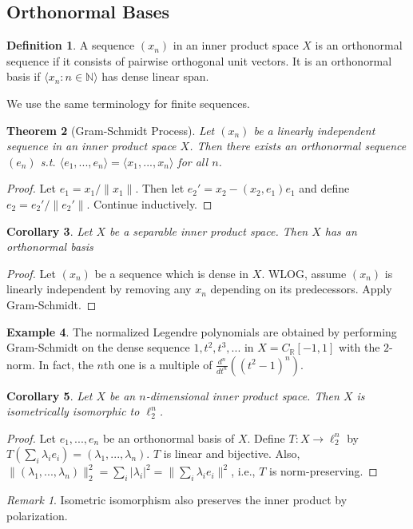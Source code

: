 \documentclass{article}
\theoremstyle{definition}
\newtheorem{defn}{Definition}[section]
\newtheorem{example}[defn]{Example}
\theoremstyle{remark}
\newtheorem{rem}{Remark}
\theoremstyle{plain}
\newtheorem{thm}[defn]{Theorem}
\newtheorem{crly}[defn]{Corollary}
\newcommand{\NN}{\mathbb{N}}
\newcommand{\RR}{\mathbb{R}}
\begin{document}
\subsection{Orthonormal Bases}
\begin{defn}
    A sequence $(x_n)$ in an inner product space $X$ is an orthonormal sequence if it consists of pairwise orthogonal unit vectors. It is an orthonormal basis if $\langle x_n:n\in\NN\rangle$ has dense linear span.
\end{defn}
We use the same terminology for finite sequences.
\begin{thm}[Gram-Schmidt Process]
    Let $(x_n)$ be a linearly independent sequence in an inner product space $X$. Then there exists an orthonormal sequence $(e_n)$ s.t. $\langle e_1,...,e_n\rangle=\langle x_1,...,x_n\rangle$ for all $n$.
\end{thm}
\begin{proof}
    Let $e_1=x_1/\|x_1\|$. Then let $e_2'=x_2-(x_2,e_1)e_1$ and define $e_2=e_2'/\|e_2'\|$. Continue inductively.
\end{proof}
\begin{crly}
    Let $X$ be a separable inner product space. Then $X$ has an orthonormal basis
\end{crly}
\begin{proof}
    Let $(x_n)$ be a sequence which is dense in $X$. WLOG, assume $(x_n)$ is linearly independent by removing any $x_n$ depending on its predecessors. Apply Gram-Schmidt.
\end{proof}
\begin{example}
    The normalized Legendre polynomials are obtained by performing Gram-Schmidt on the dense sequence $1,t^2,t^3,...$ in $X=C_\RR[-1,1]$ with the $2$-norm. In fact, the $n$th one is a multiple of $\frac{d^n}{dt^n}((t^2-1)^n)$.
\end{example}
\begin{crly}
    Let $X$ be an $n$-dimensional inner product space. Then $X$ is isometrically isomorphic to $\ell_2^n$.
\end{crly}
\begin{proof}
    Let $e_1,...,e_n$ be an orthonormal basis of $X$. Define $T:X\to \ell_2^n$ by $T(\sum_i\lambda_ie_i)=(\lambda_1,...,\lambda_n)$. $T$ is linear and bijective. Also, $\|(\lambda_1,...,\lambda_n)\|_2^2=\sum_i|\lambda_i|^2=\|\sum_i\lambda_ie_i\|^2$, i.e., $T$ is norm-preserving.
\end{proof}
\begin{rem}
    Isometric isomorphism also preserves the inner product by polarization.
\end{rem}
\end{document}
